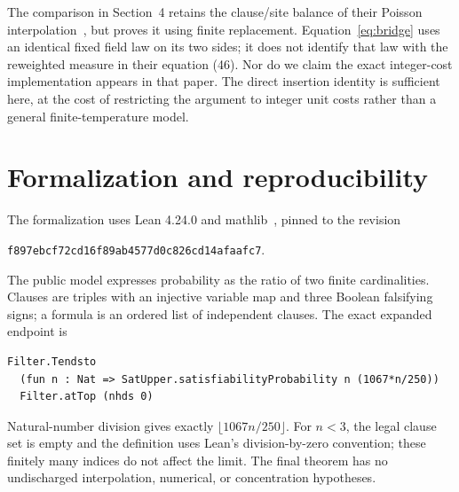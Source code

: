 \documentclass[11pt]{article}
\theoremstyle{remark}
\newcommand{\code}[1]{\texttt{\small #1}}
\begin{document}
The comparison in Section~4 retains the clause/site balance of their
Poisson interpolation~\cite[equations (51)--(54)]{FL}, but proves it
using finite replacement. Equation~\eqref{eq:bridge} uses an identical
fixed field law on its two sides; it does not identify that law with the
reweighted measure in their equation (46). Nor do we claim the exact
integer-cost implementation appears in that paper. The direct insertion
identity is sufficient here, at the cost of restricting the argument to
integer unit costs rather than a general finite-temperature model.

\section{Formalization and reproducibility}\label{sec:lean}
The formalization uses Lean 4.24.0 and mathlib~\cite{mathlib}, pinned to
the revision
\begin{center}
\code{f897ebcf72cd16f89ab4577d0c826cd14afaafc7}.
\end{center}
The public
model expresses probability as the ratio of two finite cardinalities.
Clauses are triples with an injective variable map and three Boolean
falsifying signs; a formula is an ordered list of independent clauses.
The exact expanded endpoint is
\begin{verbatim}
Filter.Tendsto
  (fun n : Nat => SatUpper.satisfiabilityProbability n (1067*n/250))
  Filter.atTop (nhds 0)
\end{verbatim}
Natural-number division gives exactly $\lfloor1067n/250\rfloor$.
For $n<3$, the legal clause set is empty and the definition uses Lean's
division-by-zero convention; these finitely many indices do not affect
the limit. The final theorem has no undischarged interpolation, numerical,
or concentration hypotheses.
\end{document}
